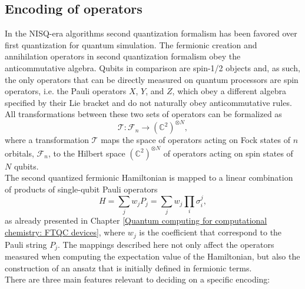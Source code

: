 \subsection{Encoding of operators}
In the NISQ-era algorithms second quantization formalism has been favored over first quantization for quantum simulation. The fermionic creation and annihilation operators in second quantization formalism obey the anticommutative algebra. Qubits in comparison are spin-1/2 objects and, as such, the only operators that can be directly measured on quantum processors are spin operators, i.e. the Pauli operators $X$, $Y$, and $Z$, which obey a different algebra specified by their Lie bracket and do not naturally obey anticommutative rules. \\
All transformations between these two sets of operators can be formalized as
\begin{equation}
    \mathcal{T}: \mathcal{F}_n \rightarrow (\mathbb{C}^2)^{\otimes N},
\end{equation}
where a transformation $\mathcal{T}$ maps the space of operators acting on Fock states of $n$ orbitals, $\mathcal{F}_n$, to the Hilbert space $(\mathbb{C}^2)^{\otimes N}$ of operators acting on spin states of $N$ qubits. \\
The second quantized fermionic Hamiltonian is mapped to a linear combination of products of single-qubit Pauli operators
    \begin{equation}
        H = \sum_j w_j  P_j = \sum_j w_j \prod_i \sigma^j_i,
    \end{equation}
as already presented in Chapter \ref{Quantum computing for computational chemistry: FTQC devices}, where $w_j$ is the coefficient that correspond to the Pauli string $P_j$.
The mappings described here not only affect the operators measured when computing the expectation value of the Hamiltonian, but also the construction of an ansatz that is initially defined in fermionic terms. \\
There are three main features relevant to deciding on a specific encoding:
